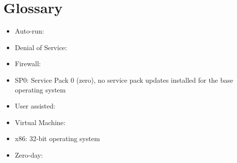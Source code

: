 \section{Glossary}

\begin{itemize}
\item Auto-run:
\item Denial of Service:
\item Firewall:
\item SP0: Service Pack 0 (zero), no service pack updates installed for the base operating system
\item User assisted: 
\item Virtual Machine:
\item x86: 32-bit operating system
\item Zero-day:
\end{itemize}